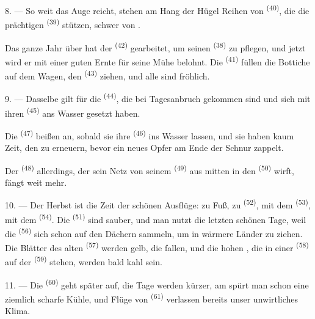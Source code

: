 8. --- So weit das Auge reicht, stehen am Hang der Hügel Reihen von
 \textsuperscript{(40)}, die die prächtigen 
\textsuperscript{(39)} stützen, schwer von .

Das ganze Jahr über hat der  \textsuperscript{(42)} gearbeitet, um
seinen  \textsuperscript{(38)} zu pflegen, und jetzt wird er mit
einer guten Ernte für seine Mühe belohnt. Die 
\textsuperscript{(41)} füllen die Bottiche auf dem Wagen, den 
\textsuperscript{(43)} ziehen, und alle sind fröhlich.

\VUsaut{5.0mm}
\VUsaut{3.4mm}

9. --- Dasselbe gilt für die  \textsuperscript{(44)}, die bei
Tagesanbruch gekommen sind und sich mit ihren 
\textsuperscript{(45)} ans Wasser gesetzt haben.

Die  \textsuperscript{(47)} beißen an, sobald sie ihre
 \textsuperscript{(46)} ins Wasser lassen, und sie haben kaum Zeit,
den  zu erneuern, bevor ein neues Opfer am Ende der Schnur zappelt.

Der  \textsuperscript{(48)} allerdings, der sein Netz von seinem
 \textsuperscript{(49)} aus mitten in den 
\textsuperscript{(50)} wirft, fängt weit mehr.

10. --- Der Herbst ist die Zeit der schönen Ausflüge: zu Fuß, zu 
\textsuperscript{(52)}, mit dem  \textsuperscript{(53)}, mit dem
 \textsuperscript{(54)}. Die  \textsuperscript{(51)} sind
sauber, und man nutzt die letzten schönen Tage, weil die 
\textsuperscript{(56)} sich schon auf den Dächern sammeln, um in wärmere Länder zu
ziehen. Die Blätter des alten  \textsuperscript{(57)} werden gelb,
die  fallen, und die hohen , die in einer
 \textsuperscript{(58)} auf der 
\textsuperscript{(59)} stehen, werden bald kahl sein.

11. --- Die  \textsuperscript{(60)} geht später auf, die Tage werden
kürzer, am  spürt man schon eine ziemlich scharfe Kühle, und Flüge
von  \textsuperscript{(61)} verlassen bereits unser unwirtliches
Klima.
\VUsaut{6.0mm}
\VUfilet{22mm}
